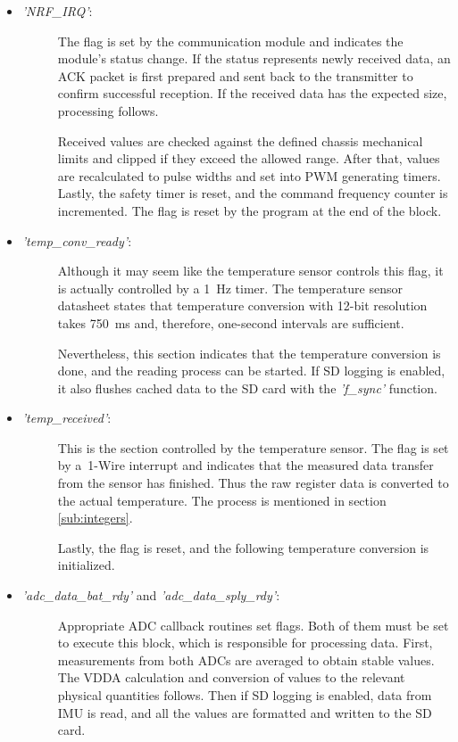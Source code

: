 \begin{itemize}
	\item \begin{description}
\item[\textit{'NRF\_IRQ'}:]
The flag is set by the communication module and indicates the module's status change. If the status represents newly received data, an ACK packet is first prepared and sent back to the transmitter to confirm successful reception. If the received data has the expected size, processing follows.

Received values are checked against the defined chassis mechanical limits and clipped if they exceed the allowed range. After that, values are recalculated to pulse widths and set into PWM generating timers. Lastly, the safety timer is reset, and the command frequency counter is incremented. The flag is reset by the program at the end of the block.
\end{description}

	\item \begin{description}
\item[\textit{'temp\_conv\_ready'}:]
Although it may seem like the temperature sensor controls this flag, it is actually controlled by a \SI{1}{\Hz} timer. The temperature sensor datasheet states that temperature conversion with 12-bit resolution takes \SI{750}{\ms} and, therefore, one-second intervals are sufficient.

Nevertheless, this section indicates that the temperature conversion is done, and the reading process can be started. If SD logging is enabled, it also flushes cached data to the SD card with the \textit{'f\_sync'} function.
\end{description}

	\item \begin{description}
\item[\textit{'temp\_received'}:]
This is the section controlled by the temperature sensor. The flag is set by a~\mbox{1-Wire} interrupt and indicates that the measured data transfer from the sensor has finished. Thus the raw register data is converted to the actual temperature. The process is mentioned in section \ref{sub:integers}.

Lastly, the flag is reset, and the following temperature conversion is initialized.
\end{description}

	\item \begin{description}
\item[\textit{'adc\_data\_bat\_rdy'} and \textit{'adc\_data\_sply\_rdy'}:]
Appropriate ADC callback routines set flags. Both of them must be set to execute this block, which is responsible for processing data. First, measurements from both ADCs are averaged to obtain stable values. The VDDA calculation and conversion of values to the relevant physical quantities follows. Then if SD logging is enabled, data from IMU is read, and all the values are formatted and written to the SD card.


\end{description}
\end{itemize}
